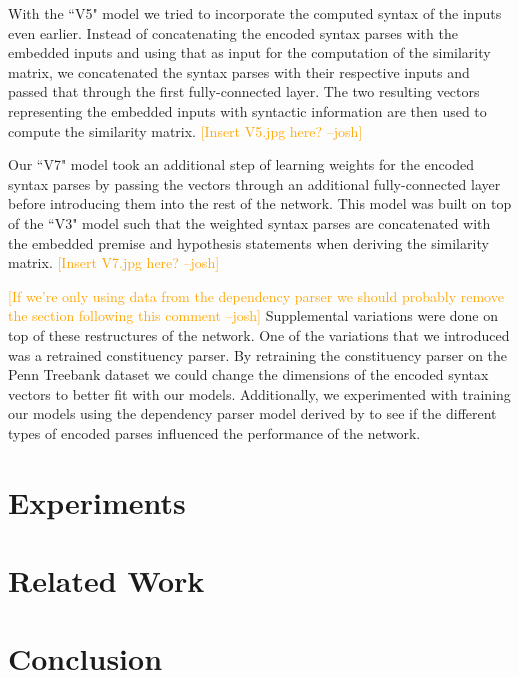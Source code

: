 \documentclass[11pt,a4paper]{article}
\newcommand{\jbcomment}[1]{\textcolor{orange}{[#1 --josh]}}
\begin{document}
With the ``V5" model we tried to incorporate the computed syntax of the inputs even 
earlier. Instead of concatenating the encoded syntax parses with the embedded inputs 
and using that as input for the computation of the similarity matrix, we concatenated 
the syntax parses with their respective inputs and passed that through the first 
fully-connected layer. The two resulting vectors representing the embedded inputs 
with syntactic information are then used to compute the similarity matrix. \jbcomment{Insert V5.jpg here?}

Our ``V7" model took an additional step of learning weights for the encoded syntax 
parses by passing the vectors through an additional fully-connected layer before 
introducing them into the rest of the network. This model was built on top of the 
``V3" model such that the weighted syntax parses are concatenated with the embedded 
premise and hypothesis statements when deriving the similarity matrix. \jbcomment{Insert V7.jpg here?}

\jbcomment{If we're only using data from the dependency parser we should probably 
remove the section following this comment}
Supplemental variations were done on top of these restructures of the network. One 
of the variations that we introduced was a retrained constituency parser. By 
retraining the constituency parser on the Penn Treebank dataset \citep{marcus1993building} 
we could change the dimensions of the encoded syntax vectors to better fit with our models. 
Additionally, we experimented with training our models using the dependency parser model 
derived by \citet{dozat2016deep} to see if the different types of encoded parses influenced 
the performance of the network.

\section{Experiments}



\section{Related Work}

\section{Conclusion}



\end{document}

